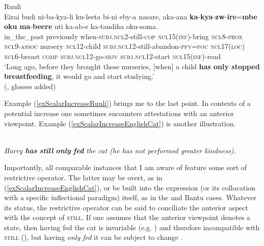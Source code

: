 \begin{exe}
	\ex Ruuli\label{exScalarIncreaseRuuli}\\
		\gll Eirai budi ni-ba-kya-li ku-leeta bi-ni eby-a nasare, aka-ana \textbf{ka}-\textbf{kya}-\textbf{zw}-\textbf{ire}=\textbf{mbe} \textbf{oku} \textbf{ma}-\textbf{beere} nti ka-ab-e ka-tandika oku-soma.\\
	in\_the\_past previously when-\textsc{subj}.\textsc{ncl}2-still-\textsc{cop} \textsc{ncl}15(\textsc{inf})-bring \textsc{ncl}8-\textsc{prox} \textsc{ncl}9-\textsc{assoc} nursery \textsc{ncl}12-child \textsc{subj}.\textsc{ncl}12-still-abandon-\textsc{pfv}=\textsc{foc} \textsc{ncl}17(\textsc{loc}) \textsc{ncl}6-breast \textsc{comp} \textsc{subj}.\textsc{ncl}12-go-\textsc{sbjv} \textsc{subj}.\textsc{ncl}12-start \textsc{ncl}15(\textsc{inf})-read\\
	\glt \lq Long ago, before they brought these nurseries, [when] a child \textbf{has only stopped breastfeeding}, it would go and start studying.'
	\\(\cite{RuuliCorpus},  glosses added)
\end{exe}
 

Example (\ref{exScalarIncreaseRuuli}) brings me to the last point. In contexts of a potential increase one sometimes encounters attestations with an anterior viewpoint. Example (\ref{exScalarIncreaseEnglishCat}) is another illustration.

\begin{exe}
	\ex {}\label{exScalarIncreaseEnglishCat}\\
	\textit{Harry \textbf{has} \textbf{still} \textbf{only} \textbf{fed} the cat \textup{(}he has not performed greater kindness\textup{)}.} \parencite[203]{Michaelis1993}
\end{exe}

Importantly, all comparable instances that I am aware of feature some sort of restrictive operator. The latter may be overt, as in (\ref{exScalarIncreaseEnglishCat}), or be built into the expression (or its collocation with a specific inflectional paradigm) itself, as in the  and Bantu cases. Whatever its status, the restrictive operator can be said to conciliate the anterior aspect with the concept of \textsc{still}. If one assumes that the anterior viewpoint denotes a state, then having fed the cat is invariable (e.g. \cite[234]{Parsons1990}) and therefore incompatible with \textsc{still} (), but having \textit{only fed} it can be subject to change \parencite{Michaelis1993}.

